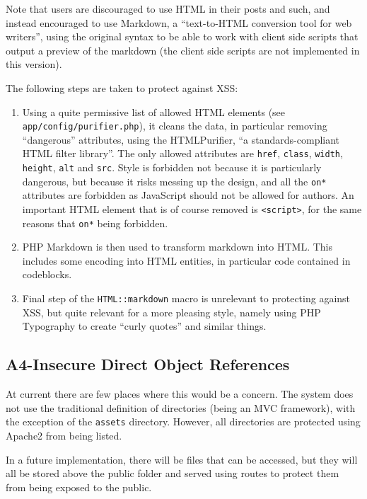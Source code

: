 Note that users are discouraged to use HTML in their posts and such, and instead encouraged to use Markdown, a ``text-to-HTML conversion tool for web writers''\citep{Markdown2013}, using the original syntax to be able to work with client side scripts that output a preview of the markdown (the client side scripts are not implemented in this version).

The following steps are taken to protect against XSS:

\begin{enumerate}[1.]
\item
  Using a quite permissive list of allowed HTML elements (see \texttt{app/config/purifier.php}), it cleans the data, in particular removing ``dangerous'' attributes, using the HTMLPurifier, ``a standards-compliant HTML filter library''\citep{Purifier2013}. The only allowed attributes are \texttt{href}, \texttt{class}, \texttt{width}, \texttt{height}, \texttt{alt} and \texttt{src}. Style is forbidden not
  because it is particularly dangerous, but because it risks messing up the design, and all the \texttt{on*} attributes are forbidden as JavaScript should not be allowed for authors. An important HTML element that is of course removed is \texttt{\textless{}script\textgreater{}}, for the same reasons that \texttt{on*} being forbidden.
\item
  PHP Markdown is then used to transform markdown into HTML. This includes some encoding into HTML entities, in particular code contained in codeblocks.
\item
  Final step of the \texttt{HTML::markdown} macro is unrelevant to protecting against XSS, but quite relevant for a more pleasing style, namely using PHP Typography to create ``curly quotes'' and similar things.
\end{enumerate}

\subsection{A4-Insecure Direct Object References}
\noindent
At current there are few places where this would be a concern. The system does not use the traditional definition of directories (being an MVC framework), with the exception of the \texttt{assets} directory. However, all directories are protected using Apache2 from being listed.

In a future implementation, there will be files that can be accessed, but they will all be stored above the public folder and served using routes to protect them from being exposed to the public.

